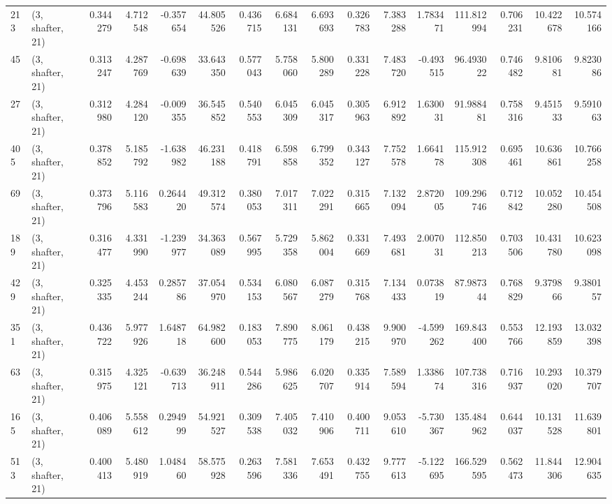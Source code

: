\begin{tabular}{llrrrrrrrrrrrrrr}
213 &  (3, shafter, 21) &   0.344279 &   4.712548 &  -0.357654 &    44.805526 &   0.436715 &   6.684131 &   6.693693 &  0.326783 &   7.383288 &   1.783471 &   111.812994 &  0.706231 &  10.422678 &  10.574166 \\
45  &  (3, shafter, 21) &   0.313247 &   4.287769 &  -0.698639 &    33.643350 &   0.577043 &   5.758060 &   5.800289 &  0.331228 &   7.483720 &  -0.493515 &    96.493022 &  0.746482 &   9.810681 &   9.823086 \\
27  &  (3, shafter, 21) &   0.312980 &   4.284120 &  -0.009355 &    36.545852 &   0.540553 &   6.045309 &   6.045317 &  0.305963 &   6.912892 &   1.630031 &    91.988481 &  0.758316 &   9.451533 &   9.591063 \\
405 &  (3, shafter, 21) &   0.378852 &   5.185792 &  -1.638982 &    46.231188 &   0.418791 &   6.598858 &   6.799352 &  0.343127 &   7.752578 &   1.664178 &   115.912308 &  0.695461 &  10.636861 &  10.766258 \\
69  &  (3, shafter, 21) &   0.373796 &   5.116583 &   0.264420 &    49.312574 &   0.380053 &   7.017311 &   7.022291 &  0.315665 &   7.132094 &   2.872005 &   109.296746 &  0.712842 &  10.052280 &  10.454508 \\
189 &  (3, shafter, 21) &   0.316477 &   4.331990 &  -1.239977 &    34.363089 &   0.567995 &   5.729358 &   5.862004 &  0.331669 &   7.493681 &   2.007031 &   112.850213 &  0.703506 &  10.431780 &  10.623098 \\
429 &  (3, shafter, 21) &   0.325335 &   4.453244 &   0.285786 &    37.054970 &   0.534153 &   6.080567 &   6.087279 &  0.315768 &   7.134433 &   0.073819 &    87.987344 &  0.768829 &   9.379866 &   9.380157 \\
351 &  (3, shafter, 21) &   0.436722 &   5.977926 &   1.648718 &    64.982600 &   0.183053 &   7.890775 &   8.061179 &  0.438215 &   9.900970 &  -4.599262 &   169.843400 &  0.553766 &  12.193859 &  13.032398 \\
63  &  (3, shafter, 21) &   0.315975 &   4.325121 &  -0.639713 &    36.248911 &   0.544286 &   5.986625 &   6.020707 &  0.335914 &   7.589594 &   1.338674 &   107.738316 &  0.716937 &  10.293020 &  10.379707 \\
165 &  (3, shafter, 21) &   0.406089 &   5.558612 &   0.294999 &    54.921527 &   0.309538 &   7.405032 &   7.410906 &  0.400711 &   9.053610 &  -5.730367 &   135.484962 &  0.644037 &  10.131528 &  11.639801 \\
513 &  (3, shafter, 21) &   0.400413 &   5.480919 &   1.048460 &    58.575928 &   0.263596 &   7.581336 &   7.653491 &  0.432755 &   9.777613 &  -5.122695 &   166.529595 &  0.562473 &  11.844306 &  12.904635 \\

\end{tabular}
